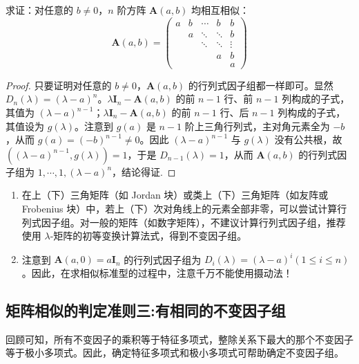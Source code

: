 \documentclass[../../main.tex]{subfiles}
\begin{document}
\begin{proposition}\label{proposition:A(a,b)矩阵均相似}
求证：对任意的 $b \neq 0$，$n$ 阶方阵 $\boldsymbol{A}(a,b)$ 均相互相似：
\[
\boldsymbol{A}(a,b) = 
\begin{pmatrix}
a & b & \cdots & b & b \\
 & a & \ddots & \ddots & b \\
 & & \ddots & \ddots & \vdots \\
 & & & a & b \\
 & & & & a
\end{pmatrix}
\]
\end{proposition}
\begin{proof}
只要证明对任意的 $b \neq 0$，$\boldsymbol{A}(a,b)$ 的行列式因子组都一样即可。显然 $D_n(\lambda) = (\lambda - a)^n$。$\lambda \boldsymbol{I}_n - \boldsymbol{A}(a,b)$ 的前 $n - 1$ 行、前 $n - 1$ 列构成的子式，其值为 $(\lambda - a)^{n - 1}$；$\lambda \boldsymbol{I}_n - \boldsymbol{A}(a,b)$ 的前 $n - 1$ 行、后 $n - 1$ 列构成的子式，其值设为 $g(\lambda)$。注意到 $g(a)$ 是 $n - 1$ 阶上三角行列式，主对角元素全为 $-b$，从而 $g(a) = (-b)^{n - 1} \neq 0$。因此 $(\lambda - a)^{n - 1}$ 与 $g(\lambda)$ 没有公共根，故 $((\lambda - a)^{n - 1}, g(\lambda)) = 1$，于是 $D_{n - 1}(\lambda) = 1$，从而 $\boldsymbol{A}(a,b)$ 的行列式因子组为 $1, \cdots, 1, (\lambda - a)^n$，结论得证.
\end{proof}
\begin{remark}
\begin{enumerate}[(1)]
\item 在上（下）三角矩阵（如 Jordan 块）或类上（下）三角矩阵（如友阵或 Frobenius 块）中，若上（下）次对角线上的元素全部非零，可以尝试计算行列式因子组。对一般的矩阵（如数字矩阵），不建议计算行列式因子组，推荐使用 $\lambda$-矩阵的初等变换计算法式，得到不变因子组。


\item 注意到 $\boldsymbol{A}(a,0) = a\boldsymbol{I}_n$ 的行列式因子组为 $D_i(\lambda) = (\lambda - a)^i (1 \leq i \leq n)$。因此，在求相似标准型的过程中，注意千万不能使用摄动法！ 
\end{enumerate}
\end{remark}



\subsection{矩阵相似的判定准则三:有相同的不变因子组}

回顾可知，所有不变因子的乘积等于特征多项式，整除关系下最大的那个不变因子等于极小多项式。因此，确定特征多项式和极小多项式可帮助确定不变因子组。
\end{document}
